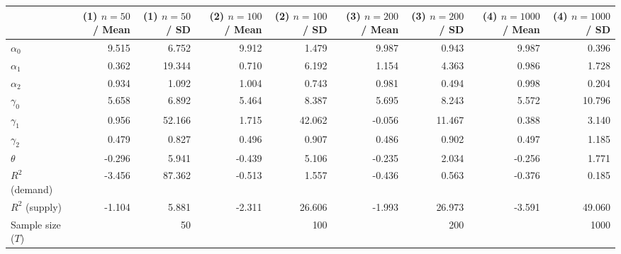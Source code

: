 
\begin{tabular}[t]{lrrrrrrrr}
\toprule
  & (1) $n=50$ / Mean & (1) $n=50$ / SD & (2) $n=100$ / Mean & (2) $n=100$ / SD & (3) $n=200$ / Mean & (3) $n=200$ / SD & (4) $n=1000$ / Mean & (4) $n=1000$ / SD\\
\midrule
$\alpha_{0}$ & 9.515 & 6.752 & 9.912 & 1.479 & 9.987 & 0.943 & 9.987 & 0.396\\
$\alpha_{1}$ & 0.362 & 19.344 & 0.710 & 6.192 & 1.154 & 4.363 & 0.986 & 1.728\\
$\alpha_{2}$ & 0.934 & 1.092 & 1.004 & 0.743 & 0.981 & 0.494 & 0.998 & 0.204\\
$\gamma_{0}$ & 5.658 & 6.892 & 5.464 & 8.387 & 5.695 & 8.243 & 5.572 & 10.796\\
$\gamma_{1}$ & 0.956 & 52.166 & 1.715 & 42.062 & -0.056 & 11.467 & 0.388 & 3.140\\
$\gamma_{2}$ & 0.479 & 0.827 & 0.496 & 0.907 & 0.486 & 0.902 & 0.497 & 1.185\\
$\theta$ & -0.296 & 5.941 & -0.439 & 5.106 & -0.235 & 2.034 & -0.256 & 1.771\\
$R^{2}$ (demand) & -3.456 & 87.362 & -0.513 & 1.557 & -0.436 & 0.563 & -0.376 & 0.185\\
$R^{2}$ (supply) & -1.104 & 5.881 & -2.311 & 26.606 & -1.993 & 26.973 & -3.591 & 49.060\\
Sample size ($T$) &  & 50 &  & 100 &  & 200 &  & 1000\\
\bottomrule
\end{tabular}
